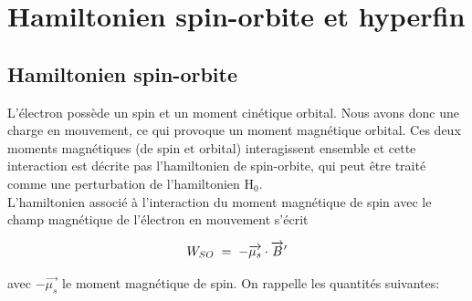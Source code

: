 \newpage
\section{Hamiltonien spin-orbite et hyperfin}
\subsection{Hamiltonien spin-orbite}





L'électron possède un spin et un moment cinétique orbital. Nous avons donc une charge en mouvement, ce qui provoque un moment magnétique orbital. Ces deux moments magnétiques (de spin et orbital) interagissent ensemble et cette interaction est décrite pas l'hamiltonien de spin-orbite, qui peut être traité comme une perturbation de l'hamiltonien H$_0$.\\
L'hamiltonien associé à l'interaction du moment magnétique de spin avec le champ magnétique de l’électron en mouvement s'écrit

\[
    W_{SO} \; = \;  -\overrightarrow{\mu_s}\cdot\overrightarrow{B}'
\]

avec $-\overrightarrow{\mu_s}$ le moment magnétique de spin. On rappelle les quantités suivantes: 

